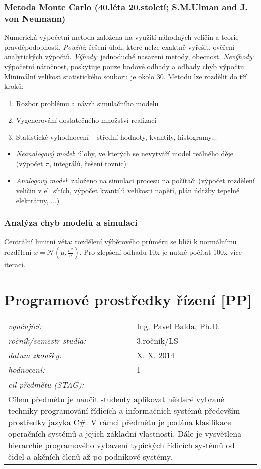 \subsubsection*{Metoda Monte Carlo (40.léta 20.století; S.M.Ulman and J. von Neumann)}
Numerická výpočetní metoda založena na využití náhodných veličin a teorie pravděpodobnosti. \textit{Použití}: řešení úloh, které nelze exaktně vyřešit, ověření analytických výpočtů. \textit{Výhody}: jednoduché nasazení metody, obecnost. \textit{Nevýhody}: výpočetní náročnost, poskytuje pouze bodové odhady a odhady chyb výpočtu. Minimální velikost statistického souboru je okolo 30. Metodu lze rozdělit do tří kroků:
\begin{enumerate}
\item Rozbor problému a návrh simulačního modelu
\item Vygenerování dostatečného množství realizací
\item Statistické vyhodnocení – střední hodnoty, kvantily, histogramy...
\end{enumerate}
\begin{itemize}
\item \textit{Neanalogový model}: úlohy, ve kterých se nevytváří model reálného děje (výpočet $ \pi $, integrálů, řešení rovnic)
\item \textit{Analogový model}: založeno na simulaci procesu na počítači (výpočet rozdělení veličin v el. sítích, výpočet kvantilů velikosti napětí, plán údržby tepelné elektrárny, ...)
\end{itemize}

\subsubsection*{Analýza chyb modelů a simulací}
Centrální limitní věta: rozdělení výběrového průměru se blíží k normálnímu rozdělení $ \bar{x} = \mathscr{N}(\mu, \frac{\sigma^2}{n}) $. Pro zlepšení odhadu 10x je nutné počítat 100x více iterací.
\newpage
\section{Programové prostředky řízení [PP]}

\begin{table}[H]
\centering
\begin{tabular}{p{4cm} p{12cm}}
\textit{vyučující:}             & Ing. Pavel Balda, Ph.D. \\
\textit{ročník/semestr studia:} & 3.ročník/LS \\
\textit{datum zkoušky:}         & X. X. 2014 \\
\textit{hodnocení:}             & 1 \\
\textit{cíl předmětu (STAG):}   & \\
\multicolumn{2}{p{16cm}}{Cílem předmětu je naučit studenty aplikovat některé vybrané techniky programování řídicích a informačních systémů především prostředky jazyka C\#. V rámci předmětu je podána klasifikace operačních systémů a jejich základní vlastnosti. Dále je vysvětlena hierarchie programového vybavení typických řídicích systémů od čidel a akčních členů až po podnikové systémy.}
\end{tabular}
\end{table}

